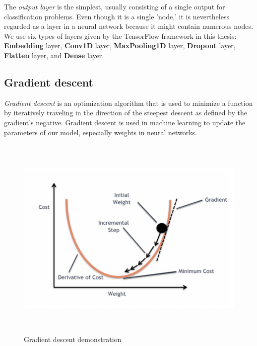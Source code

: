 The \emph{output layer} is the simplest, usually consisting of a single output for classification problems. Even though it is a single 'node,' it is nevertheless regarded as a layer in a neural network because it might contain numerous nodes. We use six types of layers given by the TensorFlow framework in this thesis: \textbf{Embedding} layer, \textbf{Conv1D} layer, \textbf{MaxPooling1D} layer, \textbf{Dropout} layer, \textbf{Flatten} layer, and \textbf{Dense} layer.
\newpage
\subsection{Gradient descent}
\label{subsec:gradient_descent}
\emph{Gradient descent} is an optimization algorithm that is used to minimize a function by iteratively traveling in the direction of the steepest descent as defined by the gradient's negative. Gradient descent is used in machine learning to update the parameters of our model, especially weights in neural networks.
\begin{figure}[!h]
	\centering
	\includegraphics[width=\linewidth, height=10cm,keepaspectratio]{figures/gradient descent.png}
   \caption{Gradient descent demonstration}
\end{figure}
